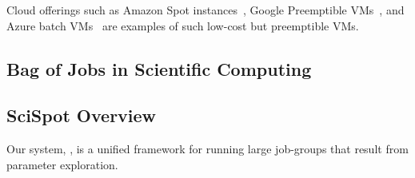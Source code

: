 Cloud offerings such as Amazon Spot instances~\cite{spot-web}, Google Preemptible VMs~\cite{preemptible}, and Azure batch VMs~\cite{azure-batch} are examples of such 
low-cost but preemptible VMs. 



\subsection{Bag of Jobs in Scientific Computing}


\subsection{SciSpot Overview}
Our system, \sysname, is a unified framework for running large job-groups that result from parameter exploration. 



